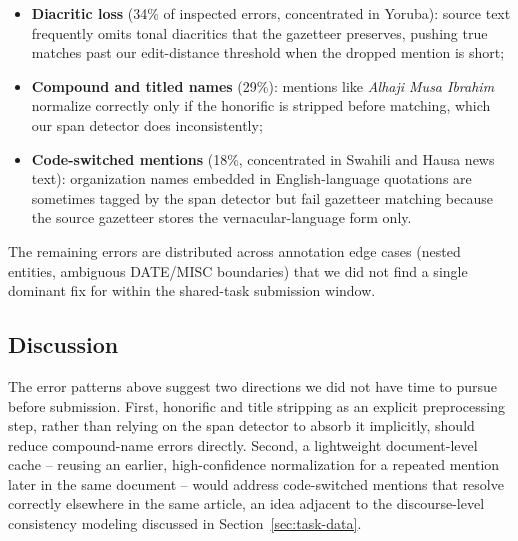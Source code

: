 \begin{itemize}[leftmargin=1.1em,itemsep=1pt,topsep=2pt]
  \item \textbf{Diacritic loss} (34\% of inspected errors, concentrated in
    Yoruba): source text frequently omits tonal diacritics that the
    gazetteer preserves, pushing true matches past our edit-distance
    threshold when the dropped mention is short;
  \item \textbf{Compound and titled names} (29\%): mentions like
    \textit{Alhaji Musa Ibrahim} normalize correctly only if the honorific
    is stripped before matching, which our span detector does
    inconsistently;
  \item \textbf{Code-switched mentions} (18\%, concentrated in Swahili and
    Hausa news text): organization names embedded in English-language
    quotations are sometimes tagged by the span detector but fail
    gazetteer matching because the source gazetteer stores the
    vernacular-language form only.
\end{itemize}

The remaining errors are distributed across annotation edge cases (nested
entities, ambiguous DATE/MISC boundaries) that we did not find a single
dominant fix for within the shared-task submission window.

\subsection{Discussion}
The error patterns above suggest two directions we did not have time to
pursue before submission. First, honorific and title stripping as an
explicit preprocessing step, rather than relying on the span detector to
absorb it implicitly, should reduce compound-name errors directly.
Second, a lightweight document-level cache -- reusing an earlier,
high-confidence normalization for a repeated mention later in the same
document -- would address code-switched mentions that resolve correctly
elsewhere in the same article, an idea adjacent to the discourse-level
consistency modeling discussed in Section~\ref{sec:task-data}.
